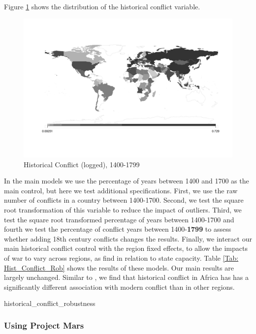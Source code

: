 Figure \ref{Fig: BreckeMap} shows the distribution of the historical conflict variable. 

   \begin{figure}[hpbt] \hspace{-0,5cm} 
   \includegraphics[width=\textwidth,
    height=\textheight, keepaspectratio]{img/historical_conflict_map.png} \caption{Historical Conflict (logged), 1400-1799} \label{Fig: BreckeMap} \end{figure}

In the main models we use the percentage of years between 1400 and 1700 as the main control, but here we test additional specifications. First, we use the raw number of conflicts in a country between 1400-1700. Second, we test the square root transformation of this variable to reduce the impact of outliers. Third, we test the square root transformed percentage of years between 1400-1700 and fourth we test the percentage of conflict years between 1400-\textbf{1799} to assess whether adding 18th century conflicts changes the results. Finally, we interact our main historical conflict control with the region fixed effects, to allow the impacts of war to vary across regions, as \citet{Dincecco2019} find in relation to state capacity. Table \ref{Tab: Hist_Conflict_Rob} shows the results of these models. Our main results are largely unchanged. Similar to \citet{Dincecco2019}, we find that historical conflict in Africa has has a significantly different association with modern conflict than in other regions. 

     {historical_conflict_robustness}

\clearpage

\subsubsection{Using Project Mars}


